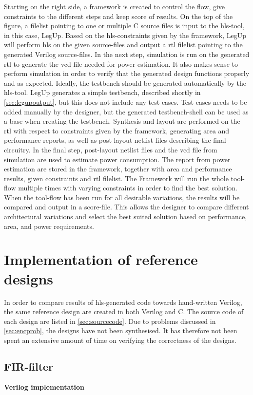 Starting on the right side, a framework is created to control the flow, give constraints to the different steps and keep score of results. On the top of the figure, a filelist pointing to one or multiple C source files is input to the \gls{hls}-tool, in this case, LegUp. Based on the \gls{hls}-constraints given by the framework, LegUp will perform \gls{hls} on the given source-files and output a \gls{rtl} filelist pointing to the generated Verilog source-files. In the next step, simulation is run on the generated \gls{rtl} to generate the \gls{vcd} file needed for power estimation. It also makes sense to perform simulation in order to verify that the generated design functions properly and as expected. Ideally, the testbench should be generated automatically by the \gls{hls}-tool. LegUp generates a simple testbench, described shortly in \cref{sec:legupoutput}, but this does not include any test-cases. Test-cases needs to be added manually by the designer, but the generated testbench-shell can be used as a base when creating the testbench. Synthesis and layout are performed on the \gls{rtl} with respect to constraints given by the framework, generating area and performance reports, as well as post-layout netlist-files describing the final circuitry. In the final step, post-layout netlist files and the \gls{vcd} file from simulation are used to estimate power consumption. The report from power estimation are stored in the framework, together with area and performance results, given constraints and \gls{rtl} filelist. The Framework will run the whole tool-flow multiple times with varying constraints in order to find the best solution. When the tool-flow has been run for all desirable variations, the results will be compared and output in a score-file. This allows the designer to compare different architectural variations and select the best suited solution based on performance, area, and power requirements.

\section{Implementation of reference designs}
In order to compare results of \gls{hls}-generated code towards hand-written Verilog, the same reference design are created in both Verilog and C. The source code of each design are listed in \cref{sec:sourcecode}. Due to problems discussed in \cref{sec:encprob}, the designs have not been synthesised. It has therefore not been spent an extensive amount of time on verifying the correctness of the designs.
\subsection{FIR-filter}
\textbf{Verilog implementation}


